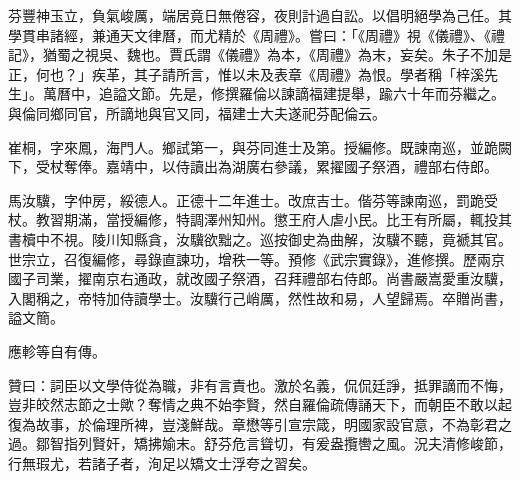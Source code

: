 \begin{pinyinscope}
芬豐神玉立，負氣峻厲，端居竟日無倦容，夜則計過自訟。以倡明絕學為己任。其學貫串諸經，兼通天文律曆，而尤精於《周禮》。嘗曰：「《周禮》視《儀禮》、《禮記》，猶蜀之視吳、魏也。賈氏謂《儀禮》為本，《周禮》為末，妄矣。朱子不加是正，何也？」疾革，其子請所言，惟以未及表章《周禮》為恨。學者稱「梓溪先生」。萬曆中，追謚文節。先是，修撰羅倫以諫謫福建提舉，踰六十年而芬繼之。與倫同鄉同官，所謫地與官又同，福建士大夫遂祀芬配倫云。

崔桐，字來鳳，海門人。鄉試第一，與芬同進士及第。授編修。既諫南巡，並跪闕下，受杖奪俸。嘉靖中，以侍讀出為湖廣右參議，累擢國子祭酒，禮部右侍郎。

馬汝驥，字仲房，綏德人。正德十二年進士。改庶吉士。偕芬等諫南巡，罰跪受杖。教習期滿，當授編修，特調澤州知州。懲王府人虐小民。比王有所屬，輒投其書櫝中不視。陵川知縣貪，汝驥欲黜之。巡按御史為曲解，汝驥不聽，竟褫其官。世宗立，召復編修，尋錄直諫功，增秩一等。預修《武宗實錄》，進修撰。歷兩京國子司業，擢南京右通政，就改國子祭酒，召拜禮部右侍郎。尚書嚴嵩愛重汝驥，入閣稱之，帝特加侍讀學士。汝驥行己峭厲，然性故和易，人望歸焉。卒贈尚書，謚文簡。

應軫等自有傳。

贊曰：詞臣以文學侍從為職，非有言責也。激於名義，侃侃廷諍，抵罪謫而不悔，豈非皎然志節之士歟？奪情之典不始李賢，然自羅倫疏傳誦天下，而朝臣不敢以起復為故事，於倫理所裨，豈淺鮮哉。章懋等引宣宗箴，明國家設官意，不為彰君之過。鄒智指列賢奸，矯拂媮末。舒芬危言聳切，有爰盎攬轡之風。況夫清修峻節，行無瑕尤，若諸子者，洵足以矯文士浮夸之習矣。


\end{pinyinscope}